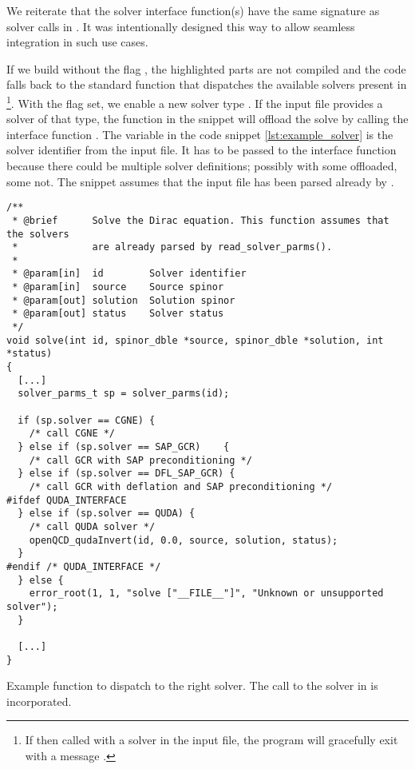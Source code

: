 We reiterate that the solver interface function(s) have the same signature as solver calls in \openqxd.
It was intentionally designed this way to allow seamless integration in such use cases.

If we build without the flag , the highlighted parts are not compiled and the code falls back to the standard function that dispatches the available solvers present in \openqxd
\footnote{If then called with a \quda solver in the input file, the program will gracefully exit with a message .}.
With the flag set, we enable a new solver type .
If the input file provides a solver of that type, the function in the snippet will offload the solve by calling the interface function .
The variable  in the code snippet \cref{lst:example_solver} is the solver identifier from the input file.
It has to be passed to the interface function because there could be multiple solver definitions; possibly with some offloaded, some not.
The snippet assumes that the input file has been parsed already by .
\begin{codelisting}
\begin{verbatim}
/**
 * @brief      Solve the Dirac equation. This function assumes that the solvers
 *             are already parsed by read_solver_parms().
 *
 * @param[in]  id        Solver identifier
 * @param[in]  source    Source spinor
 * @param[out] solution  Solution spinor
 * @param[out] status    Solver status
 */
void solve(int id, spinor_dble *source, spinor_dble *solution, int *status)
{
  [...]
  solver_parms_t sp = solver_parms(id);

  if (sp.solver == CGNE) {
    /* call CGNE */
  } else if (sp.solver == SAP_GCR)    {
    /* call GCR with SAP preconditioning */
  } else if (sp.solver == DFL_SAP_GCR) {
    /* call GCR with deflation and SAP preconditioning */
#ifdef QUDA_INTERFACE
  } else if (sp.solver == QUDA) {
    /* call QUDA solver */
    openQCD_qudaInvert(id, 0.0, source, solution, status);
  }
#endif /* QUDA_INTERFACE */
  } else {
    error_root(1, 1, "solve ["__FILE__"]", "Unknown or unsupported solver");
  }

  [...]
}
\end{verbatim}
\caption{Example function to dispatch to the right solver. The call to the solver in \quda is incorporated.}
\label{lst:example_solver}
\end{codelisting}

